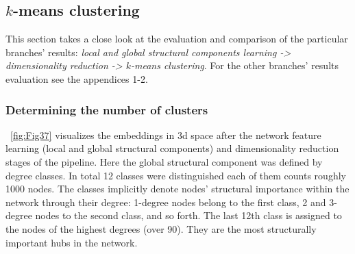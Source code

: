\subsection{$k$-means clustering}

This section takes a close look at the evaluation and comparison of the particular branches' results: \textit{local and global structural components learning -> dimensionality reduction -> $k$-means clustering}. For the other branches' results evaluation see the appendices 1-2.

\subsubsection{Determining the number of clusters}
~\autoref{fig:Fig37} visualizes the embeddings in 3d space after the network feature learning (local and global structural components) and dimensionality reduction stages of the pipeline. Here the global structural component was defined by degree classes. In total 12 classes were distinguished each of them counts roughly 1000 nodes. The classes implicitly denote nodes' structural importance within the network through their degree: 1-degree nodes belong to the first class, 2 and 3-degree nodes to the second class, and so forth. The last 12th class is assigned to the nodes of the highest degrees (over 90). They are the most structurally important hubs in the network.

